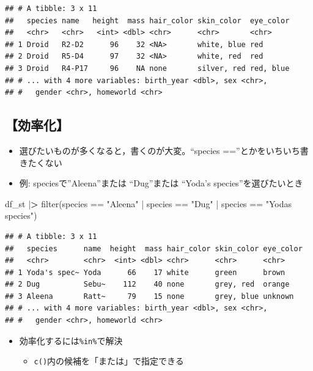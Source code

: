 \documentclass[
  xelatex,ja=standard, b5paper]{bxjsbook}
\newenvironment{Shaded}{\begin{snugshade}}{\end{snugshade}}
\newcommand{\ErrorTok}[1]{\textcolor[rgb]{0.64,0.00,0.00}{\textbf{#1}}}
\newcommand{\FunctionTok}[1]{\textcolor[rgb]{0.00,0.00,0.00}{#1}}
\newcommand{\NormalTok}[1]{#1}
\newcommand{\SpecialCharTok}[1]{\textcolor[rgb]{0.00,0.00,0.00}{#1}}
\newcommand{\StringTok}[1]{\textcolor[rgb]{0.31,0.60,0.02}{#1}}
\providecommand{\tightlist}{%
  \setlength{\itemsep}{0pt}\setlength{\parskip}{0pt}}
\begin{document}
\begin{verbatim}
## # A tibble: 3 x 11
##   species name   height  mass hair_color skin_color  eye_color
##   <chr>   <chr>   <int> <dbl> <chr>      <chr>       <chr>    
## 1 Droid   R2-D2      96    32 <NA>       white, blue red      
## 2 Droid   R5-D4      97    32 <NA>       white, red  red      
## 3 Droid   R4-P17     96    NA none       silver, red red, blue
## # ... with 4 more variables: birth_year <dbl>, sex <chr>,
## #   gender <chr>, homeworld <chr>
\end{verbatim}

\hypertarget{filter-multi-eff}{%
\subsection{【効率化】}\label{filter-multi-eff}}

\begin{itemize}
\tightlist
\item
  選びたいものが多くなると，書くのが大変。``species ==''とかをいちいち書きたくない
\item
  例: speciesで''Aleena''または ``Dug''または ``Yoda's species''を選びたいとき
\end{itemize}

\begin{Shaded}
\begin{Highlighting}[]
\NormalTok{df\_st }\SpecialCharTok{|}\ErrorTok{\textgreater{}} 
  \FunctionTok{filter}\NormalTok{(species }\SpecialCharTok{==} \StringTok{"Aleena"} \SpecialCharTok{|}\NormalTok{ species }\SpecialCharTok{==} \StringTok{"Dug"} \SpecialCharTok{|} 
\NormalTok{         species }\SpecialCharTok{==} \StringTok{"Yoda\textquotesingle{}s species"}\NormalTok{)}
\end{Highlighting}
\end{Shaded}

\begin{verbatim}
## # A tibble: 3 x 11
##   species      name  height  mass hair_color skin_color eye_color
##   <chr>        <chr>  <int> <dbl> <chr>      <chr>      <chr>    
## 1 Yoda's spec~ Yoda      66    17 white      green      brown    
## 2 Dug          Sebu~    112    40 none       grey, red  orange   
## 3 Aleena       Ratt~     79    15 none       grey, blue unknown  
## # ... with 4 more variables: birth_year <dbl>, sex <chr>,
## #   gender <chr>, homeworld <chr>
\end{verbatim}

\begin{itemize}
\tightlist
\item
  効率化するには\texttt{\%in\%}で解決

  \begin{itemize}
  \tightlist
  \item
    \texttt{c()}内の候補を「または」で指定できる
  \end{itemize}
\end{itemize}
\end{document}
